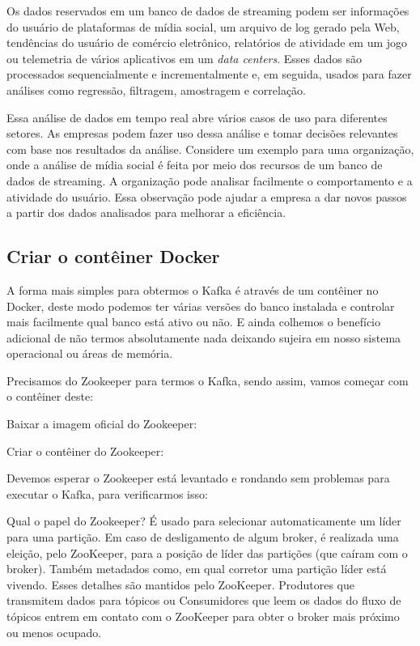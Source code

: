 \documentclass[a4paper,11pt]{article}
\begin{document}
Os dados reservados em um banco de dados de streaming podem ser informações do usuário de plataformas de mídia social, um arquivo de log gerado pela Web, tendências do usuário de comércio eletrônico, relatórios de atividade em um jogo ou telemetria de vários aplicativos em um \textit{data centers}. Esses dados são processados sequencialmente e incrementalmente e, em seguida, usados para fazer análises como regressão, filtragem, amostragem e correlação.

Essa análise de dados em tempo real abre vários casos de uso para diferentes setores. As empresas podem fazer uso dessa análise e tomar decisões relevantes com base nos resultados da análise. Considere um exemplo para uma organização, onde a análise de mídia social é feita por meio dos recursos de um banco de dados de streaming. A organização pode analisar facilmente o comportamento e a atividade do usuário. Essa observação pode ajudar a empresa a dar novos passos a partir dos dados analisados para melhorar a eficiência. 

\subsection{Criar o contêiner Docker}
A forma mais simples para obtermos o Kafka é através de um contêiner no Docker, deste modo podemos ter várias versões do banco instalada e controlar mais facilmente qual banco está ativo ou não. E ainda colhemos o benefício adicional de não termos absolutamente nada deixando sujeira em nosso sistema operacional ou áreas de memória.

Precisamos do Zookeeper para termos o Kafka, sendo assim, vamos começar com o contêiner deste: 

Baixar a imagem oficial do Zookeeper: \\

Criar o contêiner do Zookeeper: \\

Devemos esperar o Zookeeper está levantado e rondando sem problemas para executar o Kafka, para verificarmos isso: \\

Qual o papel do Zookeeper? É usado para selecionar automaticamente um líder para uma partição. Em caso de desligamento de algum broker, é realizada uma eleição, pelo ZooKeeper, para a posição de líder das partições (que caíram com o broker). Também metadados como, em qual corretor uma partição líder está vivendo. Esses detalhes são mantidos pelo ZooKeeper. Produtores que transmitem dados para tópicos ou Consumidores que leem os dados do fluxo de tópicos entrem em contato com o ZooKeeper para obter o broker mais próximo ou menos ocupado. 
	
\end{document}
